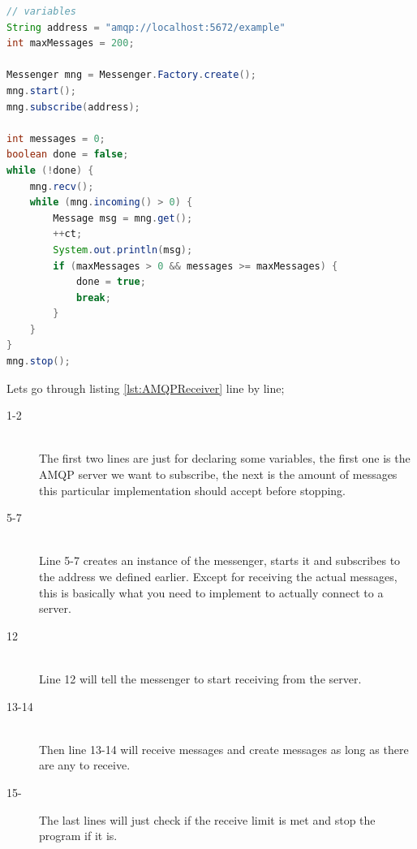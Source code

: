 \begin{lstlisting}[language=Java, captionpos=b, caption=Example use of Messenger to subscribe, frame=bt, showstringspaces=false,label={lst:AMQPReceiver}]
// variables
String address = "amqp://localhost:5672/example"
int maxMessages = 200;

Messenger mng = Messenger.Factory.create();
mng.start();
mng.subscribe(address);

int messages = 0;
boolean done = false;
while (!done) {
    mng.recv();
    while (mng.incoming() > 0) {
        Message msg = mng.get();
        ++ct;
        System.out.println(msg);
        if (maxMessages > 0 && messages >= maxMessages) {
            done = true;
            break;
        }
    }
}
mng.stop();
\end{lstlisting}

\noindent Lets go through listing \ref{lst:AMQPReceiver} line by line;

\begin{description}
\item[1-2] \hfill \\ The first two lines are just for declaring some variables, the first one is the AMQP server we want to subscribe, the next is the amount of messages this particular implementation should accept before stopping.

\item[5-7] \hfill \\ Line 5-7 creates an instance of the messenger, starts it and subscribes to the address we defined earlier. Except for receiving the actual messages, this is basically what you need to implement to actually connect to a server.

\item[12] \hfill \\ Line 12 will tell the messenger to start receiving from the server. 
\item[13-14] \hfill \\ Then line 13-14 will receive messages and create messages as long as there are any to receive.

\item[15-] \hfill The last lines will just check if the receive limit is met and stop the program if it is.
\end{description}

\clearpage